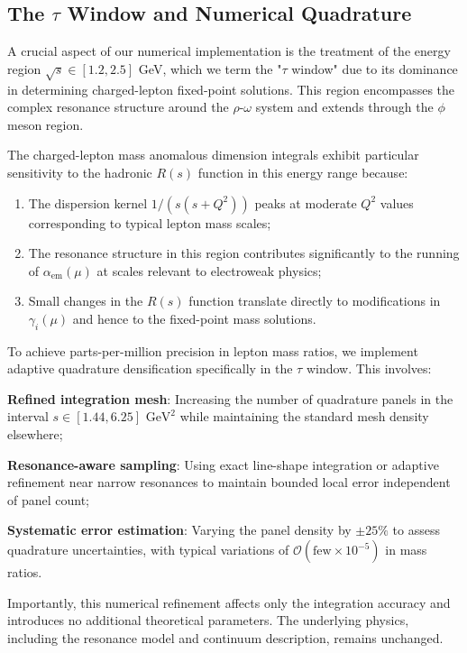 \documentclass[%
amsmath,amssymb,
aps,
prb,
floatfix,
twocolumn
]{revtex4-2}
\begin{document}
\subsection{The $\tau$ Window and Numerical Quadrature}
\label{subsec:tau_window}

A crucial aspect of our numerical implementation is the treatment of the energy region $\sqrt{s} \in [1.2, 2.5]$ GeV, which we term the "$\tau$ window" due to its dominance in determining charged-lepton fixed-point solutions. This region encompasses the complex resonance structure around the $\rho$-$\omega$ system and extends through the $\phi$ meson region.

The charged-lepton mass anomalous dimension integrals exhibit particular sensitivity to the hadronic $R(s)$ function in this energy range because:

\begin{enumerate}
\item The dispersion kernel $1/(s(s + Q^2))$ peaks at moderate $Q^2$ values corresponding to typical lepton mass scales;

\item The resonance structure in this region contributes significantly to the running of $\alpha_{\text{em}}(\mu)$ at scales relevant to electroweak physics;

\item Small changes in the $R(s)$ function translate directly to modifications in $\gamma_i(\mu)$ and hence to the fixed-point mass solutions.
\end{enumerate}

To achieve parts-per-million precision in lepton mass ratios, we implement adaptive quadrature densification specifically in the $\tau$ window. This involves:

\textbf{Refined integration mesh}: Increasing the number of quadrature panels in the interval $s \in [1.44, 6.25] \text{ GeV}^2$ while maintaining the standard mesh density elsewhere;

\textbf{Resonance-aware sampling}: Using exact line-shape integration or adaptive refinement near narrow resonances to maintain bounded local error independent of panel count;

\textbf{Systematic error estimation}: Varying the panel density by $\pm 25\%$ to assess quadrature uncertainties, with typical variations of $\mathcal{O}(\text{few} \times 10^{-5})$ in mass ratios.

Importantly, this numerical refinement affects only the integration accuracy and introduces no additional theoretical parameters. The underlying physics, including the resonance model and continuum description, remains unchanged.
\end{document}
